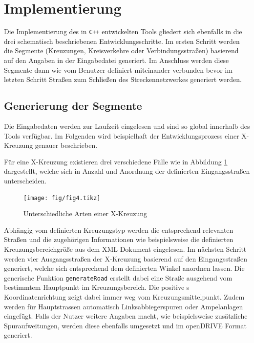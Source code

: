 \section{Implementierung}
Die Implementierung des in \texttt{C++} entwickelten Tools gliedert sich ebenfalls in die drei schematisch beschriebenen Entwicklungsschritte. Im ersten Schritt werden die Segmente (Kreuzungen, Kreisverkehre oder Verbindungsstraßen) basierend auf den Angaben in der Eingabedatei generiert. Im Anschluss werden diese Segmente dann wie vom Benutzer definiert miteinander verbunden bevor im letzten Schritt Straßen zum Schließen des Streckennetzwerkes generiert werden.

\subsection{Generierung der Segmente}

Die Eingabedaten werden zur Laufzeit eingelesen und sind so global innerhalb des Tools verfügbar. Im Folgenden wird beispielhaft der Entwicklungsprozess einer X-Kreuzung genauer beschrieben.

Für eine X-Kreuzung existieren drei verschiedene Fälle wie in Abbildung \ref{abb4} dargestellt, welche sich in Anzahl und Anordnung der definierten Eingangsstraßen unterscheiden.

\begin{figure}[H]
\flushleft
\texttt{[image: fig/fig4.tikz]}
\caption{Unterschiedliche Arten einer X-Kreuzung}
\label{abb4}
\end{figure}

Abhängig vom definierten Kreuzungstyp werden die entsprechend relevanten Straßen und die zugehörigen Informationen wie beispielsweise die definierten Kreuzungsbereichgröße aus dem XML Dokument eingelesen. Im nächsten Schritt werden vier Ausgangsstraßen der X-Kreuzung basierend auf den Eingangsstraßen generiert, welche sich entsprechend dem definierten Winkel anordnen lassen. Die generische Funktion \texttt{generateRoad} erstellt dabei eine Straße ausgehend vom bestimmtem Hauptpunkt im Kreuzungsbereich. Die positive s Koordinatenrichtung zeigt dabei immer weg vom Kreuzungsmittelpunkt. Zudem werden für Hauptstrassen automatisch Linksabbiegerspuren oder Ampelanlagen eingefügt. Falls der Nutzer weitere Angaben macht, wie beispielsweise zusätzliche Spuraufweitungen, werden diese ebenfalls umgesetzt und im openDRIVE Format generiert.

